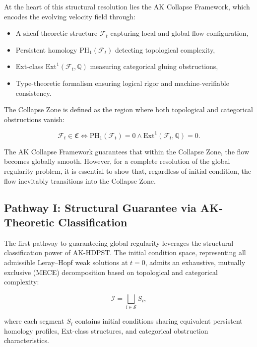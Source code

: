 \documentclass[11pt]{article}
\begin{document}
At the heart of this structural resolution lies the AK Collapse Framework, which encodes the evolving velocity field through:

\begin{itemize}
  \item A sheaf-theoretic structure $\mathcal{F}_t$ capturing local and global flow configuration,
  \item Persistent homology $\mathrm{PH}_1(\mathcal{F}_t)$ detecting topological complexity,
  \item Ext-class $\mathrm{Ext}^1(\mathcal{F}_t, \mathbb{Q})$ measuring categorical gluing obstructions,
  \item Type-theoretic formalism ensuring logical rigor and machine-verifiable consistency.
\end{itemize}

The Collapse Zone is defined as the region where both topological and categorical obstructions vanish:

\begin{equation}
\mathcal{F}_t \in \mathfrak{C} \iff \mathrm{PH}_1(\mathcal{F}_t) = 0 \land \mathrm{Ext}^1(\mathcal{F}_t, \mathbb{Q}) = 0.
\end{equation}

The AK Collapse Framework guarantees that within the Collapse Zone, the flow becomes globally smooth. However, for a complete resolution of the global regularity problem, it is essential to show that, regardless of initial condition, the flow inevitably transitions into the Collapse Zone.

\subsection{Pathway I: Structural Guarantee via AK-Theoretic Classification}

The first pathway to guaranteeing global regularity leverages the structural classification power of AK-HDPST. The initial condition space, representing all admissible Leray--Hopf weak solutions at $t = 0$, admits an exhaustive, mutually exclusive (MECE) decomposition based on topological and categorical complexity:

\begin{equation}
\mathcal{I} = \bigsqcup_{i \in \mathcal{S}} S_i,
\end{equation}

where each segment $S_i$ contains initial conditions sharing equivalent persistent homology profiles, Ext-class structures, and categorical obstruction characteristics.
\end{document}
